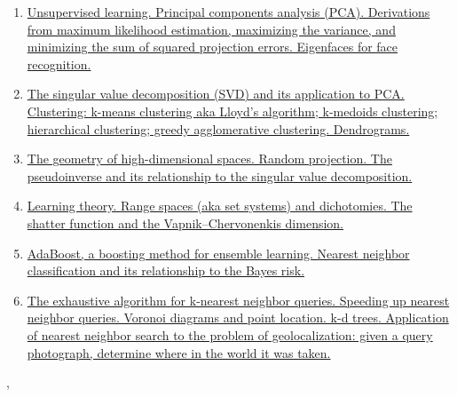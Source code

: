 \documentclass[11pt]{article}
\renewcommand{\today}{\shortmonthname[\the\month] \the \day,  \the\year}
\begin{document}
\begin{enumerate}
	\item  \href{https://mp.weixin.qq.com/s/xc-ND7VF5KPcOJs0vlph9g}{Unsupervised learning. Principal components analysis (PCA). Derivations from maximum likelihood estimation, maximizing the variance, and minimizing the sum of squared projection errors. Eigenfaces for face recognition.} %
	\item  \href{https://mp.weixin.qq.com/s/NylGFLS2hpNb4zr748I4FQ}{The singular value decomposition (SVD) and its application to PCA. Clustering: k-means clustering aka Lloyd's algorithm; k-medoids clustering; hierarchical clustering; greedy agglomerative clustering. Dendrograms. } %
	\item  \href{https://mp.weixin.qq.com/s/zx9pddBElzCNFuR45IG9DA}{The geometry of high-dimensional spaces. Random projection. The pseudoinverse and its relationship to the singular value decomposition.} %
	\item  \href{https://mp.weixin.qq.com/s/PzYpBKg1uC1HJ0fg4QOawA}{ Learning theory. Range spaces (aka set systems) and dichotomies. The shatter function and the Vapnik–Chervonenkis dimension.} %
	\item  \href{https://mp.weixin.qq.com/s/ZV-BBhSOEkqZ1YiWtEqezg}{AdaBoost, a boosting method for ensemble learning. Nearest neighbor classification and its relationship to the Bayes risk.} %
	\item  \href{https://mp.weixin.qq.com/s/dZRt8hDcFl_0-X60xCdg4w}{The exhaustive algorithm for k-nearest neighbor queries. Speeding up nearest neighbor queries. Voronoi diagrams and point location. k-d trees. Application of nearest neighbor search to the problem of geolocalization: given a query photograph, determine where in the world it was taken.} %
\end{enumerate}




%
\begin{flushright}
	\tiny \today 
\end{flushright}
\end{document}
